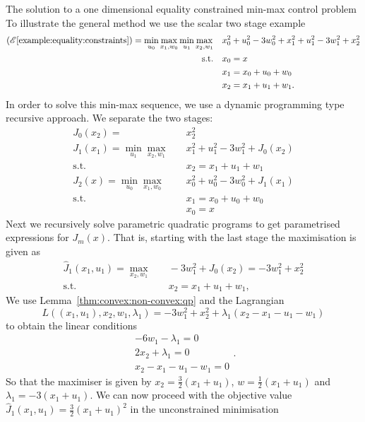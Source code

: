 \begin{example}{The solution to a one dimensional equality constrained min-max control problem}\label{example:equality:constraints}%
To illustrate the general method we use the scalar two stage example
%
$$\begin{aligned}
	(\mathscr E\ref{example:equality:constraints}) = \min_{u_0}\max_{x_1,w_0}\min_{u_1}\max_{x_2,w_1}& \quad x_0^2+u_0^2  -3w_0^2 + x_1^2+u_1^2-3w_1^2+x_2^2\\
	\text{s.t.}&\quad x_0 = x\\
	&\quad x_1 = x_0+u_0+w_0\\
	&\quad x_2 = x_1 + u_1+ w_1.
	\end{aligned}
$$
%
In order to solve this min-max sequence, we use a dynamic programming type recursive approach.
%
We separate the two stages:
%
$$
\begin{aligned}
	J_0(x_2) = &\quad x_2^2\\
	J_1(x_1) = \min_{u_1}\max_{x_2,w_1}&\quad x_1^2+u_1^2-3w_1^2+J_0(x_2)\\
	\text{s.t.}&\quad x_2 = x_1+u_1+w_1\\
	J_2(x) = \min_{u_0}\max_{x_1,w_0}&\quad x_0^2+u_0^2-3w_0^2+J_1(x_1)\\
	\text{s.t.}&\quad x_1 = x_0+u_0+w_0\\
	&\quad x_0 = x
\end{aligned}
$$
%
Next we recursively solve parametric quadratic programs to get parametrised expressions for $J_m(x)$.
%
That is, starting with the last stage the maximisation is given as
%
$$
\begin{aligned}
	\hat J_1(x_1,u_1) = \max_{x_2,w_1}&\quad -3w_1^2+J_0(x_2) = -3w_1^2+x_2^2\\
	\text{s.t.}&\quad x_2 = x_1+u_1+w_1,
\end{aligned}
$$
%
We use Lemma~\ref{thm:convex:non-convex:qp} and the Lagrangian
%
$$
	L((x_1,u_1),x_2,w_1,\lambda_1)= -3w_1^2+x_2^2 + \lambda_1(x_2 - x_1-u_1-w_1)
$$
%
to obtain the linear conditions
%
$$
	\begin{aligned}-6w_1-\lambda_1=0\\ 
	2x_2 +\lambda_1 = 0\\
	x_2 - x_1-u_1-w_1 = 0
	\end{aligned}.
$$
%
So that the maximiser is given by $x_2 = \frac{3}{2}(x_1+u_1)$, $w = \frac{1}{2}(x_1+u_1)$ and~$\lambda_1=-3(x_1+u_1)$.
%
We can now proceed with the objective value~$\hat J_1(x_1,u_1) = \frac{3}{2}(x_1+u_1)^2$ in the unconstrained minimisation

\end{example}
